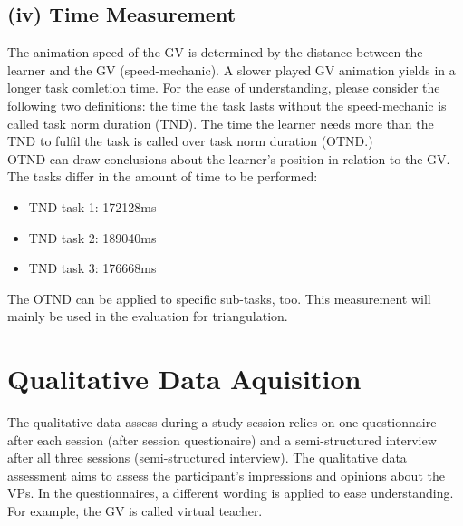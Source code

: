 \subsection{(iv) Time Measurement}
The animation speed of the GV is determined by the distance between the learner and the GV (speed-mechanic). A slower played GV animation yields in a longer task comletion time. For the ease of understanding, please consider the following two definitions: the time the task lasts without the speed-mechanic is called task norm duration (TND). The time the learner  needs more than the TND to fulfil the task is called over task norm duration (OTND.)\\
OTND can draw conclusions about the learner's position in relation to the GV.
The tasks differ in the amount of time to be performed:
\begin{itemize}
	\item TND task 1: 172128ms
	\item TND task 2: 189040ms
	\item TND task 3: 176668ms
\end{itemize}
The OTND can be applied to specific sub-tasks, too. This measurement will mainly be used in the evaluation for triangulation.

\section{Qualitative Data Aquisition}
\label{sec:quali_logging}
The qualitative data assess during a study session relies on one questionnaire after each session (after session questionaire) and a semi-structured interview after all three sessions (semi-structured interview). The qualitative data assessment aims to assess the participant's impressions and opinions about the VPs. In the questionnaires, a different wording is applied to ease understanding. For example, the GV is called virtual teacher. 

